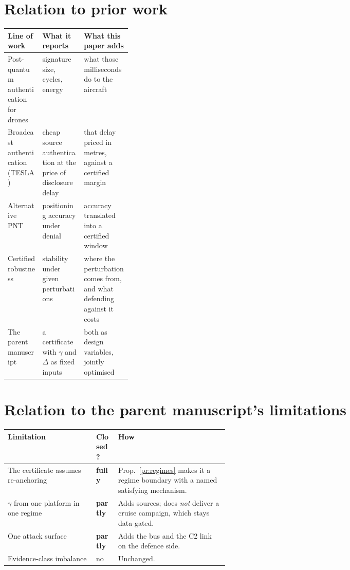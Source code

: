 \documentclass[11pt,a4paper]{article}
\begin{document}
\section{Relation to prior work}
\begin{center}\small
\begin{tabularx}{\linewidth}{@{}P{0.28\linewidth}YY@{}}
\toprule
\textbf{Line of work} & \textbf{What it reports} & \textbf{What this paper adds} \\
\midrule
Post-quantum authentication for drones~\cite{pq_drone_networks,utm_survey2026}
& signature size, cycles, energy & what those milliseconds do to the aircraft \\
Broadcast authentication (TESLA)~\cite{perrig2000tesla} & cheap source
authentication at the price of disclosure delay & that delay priced in metres,
against a certified margin \\
Alternative PNT~\cite{kassas2021leodoppler,kassas2022jammer} & positioning
accuracy under denial & accuracy translated into a certified window \\
Certified robustness~\cite{cohen2019smoothing,gronwall1919} & stability under
given perturbations & where the perturbation comes from, and what defending
against it costs \\
The parent manuscript~\cite{parentpaper} & a certificate with $\gamma$ and
$\Delta$ as fixed inputs & both as design variables, jointly optimised \\
\bottomrule
\end{tabularx}
\end{center}

\section{Relation to the parent manuscript's limitations}
\begin{center}\small
\begin{tabularx}{\linewidth}{@{}P{0.40\linewidth}P{0.10\linewidth}Y@{}}
\toprule
\textbf{Limitation} & \textbf{Closed?} & \textbf{How} \\
\midrule
The certificate assumes re-anchoring & \textbf{fully} & Prop.~\ref{pr:regimes}
makes it a regime boundary with a named satisfying mechanism. \\
$\gamma$ from one platform in one regime & \textbf{partly} & Adds
sources; does \emph{not} deliver a cruise campaign, which stays data-gated. \\
One attack surface & \textbf{partly} & Adds the bus and the C2 link on the
defence side. \\
Evidence-class imbalance & no & Unchanged. \\
\bottomrule
\end{tabularx}
\end{center}
\end{document}
